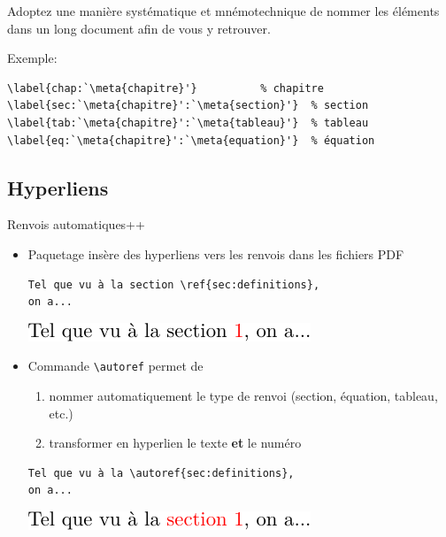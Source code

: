 \begin{conseil}
  Adoptez une manière systématique et mnémotechnique de nommer les
  éléments dans un long document afin de vous y retrouver.

  \bigskip %
  Exemple:
\begin{lstlisting}
\label{chap:`\meta{chapitre}'}          % chapitre
\label{sec:`\meta{chapitre}':`\meta{section}'}  % section
\label{tab:`\meta{chapitre}':`\meta{tableau}'}  % tableau
\label{eq:`\meta{chapitre}':`\meta{equation}'}  % équation
\end{lstlisting}
\end{conseil}


\subsection{Hyperliens}

Renvois automatiques++

\begin{itemize}
\item Paquetage  insère des hyperliens vers les renvois
  dans les fichiers PDF
  \begin{demo}
\begin{lstlisting}
Tel que vu à la section \ref{sec:definitions},
on a...
\end{lstlisting}
    \begin{framed}
      \includegraphics{renvoi_avec_ref}
    \end{framed}
  \end{demo}
\item Commande \verb=\autoref= permet de
  \begin{enumerate}
  \item nommer automatiquement le type de renvoi (section, équation,
    tableau, etc.)
  \item transformer en hyperlien le texte \textbf{et} le numéro
  \end{enumerate}
  \begin{demo}
\begin{lstlisting}
Tel que vu à la \autoref{sec:definitions},
on a...
\end{lstlisting}
    \begin{framed}
      \includegraphics{renvoi_avec_autoref}
    \end{framed}
  \end{demo}
\end{itemize}


